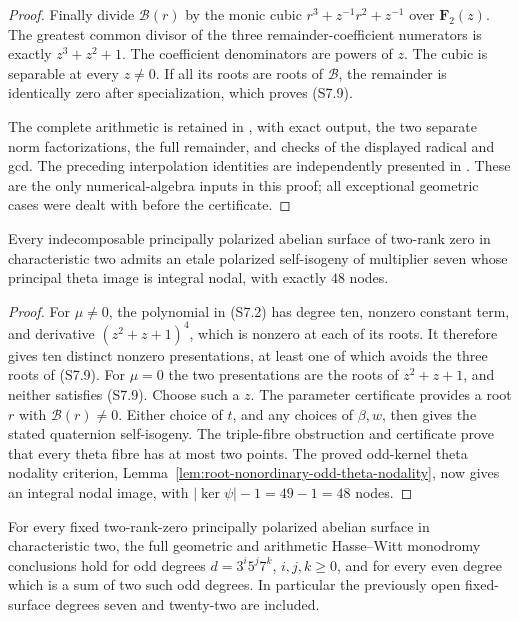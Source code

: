 \begin{proof}
Finally divide $\mathcal B(r)$ by the monic cubic
$r^3+z^{-1}r^2+z^{-1}$ over $\mathbf F_2(z)$. The greatest common
divisor of the three remainder-coefficient numerators is exactly
$z^3+z^2+1$. The coefficient denominators are powers of $z$.
The cubic is separable at every $z\ne0$. If all its roots are
roots of $\mathcal B$, the remainder is identically zero after
specialization, which proves (S7.9).

The complete arithmetic is retained in
, with exact
output, the two separate norm factorizations, the full remainder,
and checks of the displayed radical and gcd. The preceding
interpolation identities are independently presented in
. These are the
only numerical-algebra inputs in this proof; all exceptional
geometric cases were dealt with before the certificate.
\end{proof}

\begin{theorem}
\label{thm:uniform-seven-nodal-self-isogeny-candidate}
Every indecomposable principally polarized abelian surface of
two-rank zero in characteristic two admits an etale polarized
self-isogeny of multiplier seven whose principal theta image is
integral nodal, with exactly $48$ nodes.
\end{theorem}

\begin{proof}
For $\mu\ne0$, the polynomial in (S7.2) has degree ten, nonzero
constant term, and derivative $(z^2+z+1)^4$, which is nonzero at
each of its roots. It therefore gives ten distinct nonzero
presentations, at least one of which avoids the three roots of
(S7.9). For $\mu=0$ the two presentations are the roots of
$z^2+z+1$, and neither satisfies (S7.9). Choose such a $z$.
The parameter certificate provides a root $r$ with
$\mathcal B(r)\ne0$. Either choice of $t$, and any choices of
$\beta,w$, then gives the stated quaternion self-isogeny.
The triple-fibre obstruction and certificate prove that every
theta fibre has at most two points. The proved odd-kernel theta
nodality criterion, Lemma~\ref{lem:root-nonordinary-odd-theta-nodality},
now gives an integral nodal image, with
$|\ker\psi|-1=49-1=48$ nodes.
\end{proof}

\begin{corollary}
\label{cor:f0-three-five-seven-degree-groups-candidate}
For every fixed two-rank-zero principally polarized abelian surface
in characteristic two, the full geometric and arithmetic
Hasse--Witt monodromy conclusions hold for odd degrees
$d=3^i5^j7^k$, $i,j,k\ge0$, and for every even degree which is a
sum of two such odd degrees. In particular the previously open
fixed-surface degrees seven and twenty-two are included.
\end{corollary}

